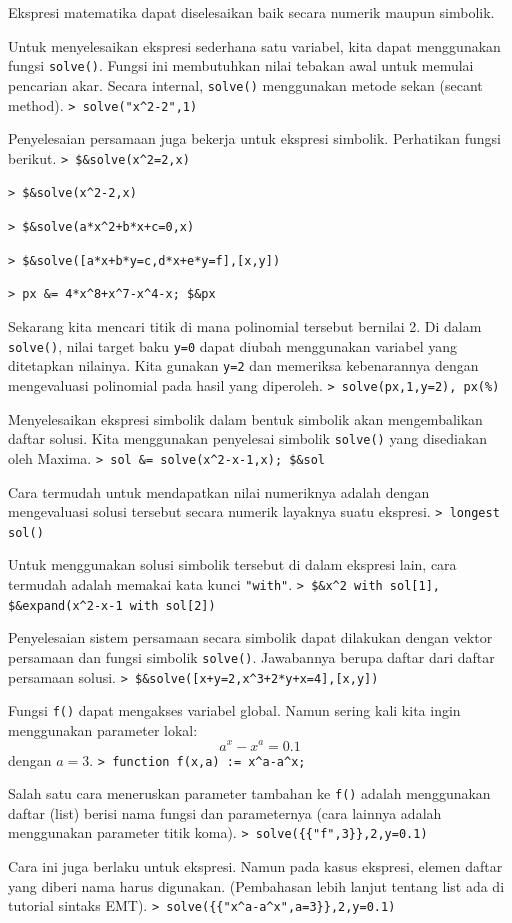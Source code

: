 \documentclass[11pt, a4paper]{article}
\newcommand{\emtcmd}[1]{\noindent\texttt{\textcolor{emtcommand}{>}\ #1}\par\smallskip}
\begin{document}
Ekspresi matematika dapat diselesaikan baik secara numerik maupun simbolik.

Untuk menyelesaikan ekspresi sederhana satu variabel, kita dapat menggunakan fungsi \texttt{solve()}. Fungsi ini membutuhkan nilai tebakan awal untuk memulai pencarian akar. Secara internal, \texttt{solve()} menggunakan metode sekan (secant method).
\emtcmd{solve("x\^{}2-2",1)}

Penyelesaian persamaan juga bekerja untuk ekspresi simbolik. Perhatikan fungsi berikut.
\emtcmd{\$\&solve(x\^{}2=2,x)}
\emtcmd{\$\&solve(x\^{}2-2,x)}
\emtcmd{\$\&solve(a*x\^{}2+b*x+c=0,x)}
\emtcmd{\$\&solve([a*x+b*y=c,d*x+e*y=f],[x,y])}
\emtcmd{px \&= 4*x\^{}8+x\^{}7-x\^{}4-x; \$\&px}

Sekarang kita mencari titik di mana polinomial tersebut bernilai 2. Di dalam \texttt{solve()}, nilai target baku \texttt{y=0} dapat diubah menggunakan variabel yang ditetapkan nilainya. Kita gunakan \texttt{y=2} dan memeriksa kebenarannya dengan mengevaluasi polinomial pada hasil yang diperoleh.
\emtcmd{solve(px,1,y=2), px(\%)}

Menyelesaikan ekspresi simbolik dalam bentuk simbolik akan mengembalikan daftar solusi. Kita menggunakan penyelesai simbolik \texttt{solve()} yang disediakan oleh Maxima.
\emtcmd{sol \&= solve(x\^{}2-x-1,x); \$\&sol}

Cara termudah untuk mendapatkan nilai numeriknya adalah dengan mengevaluasi solusi tersebut secara numerik layaknya suatu ekspresi.
\emtcmd{longest sol()}

Untuk menggunakan solusi simbolik tersebut di dalam ekspresi lain, cara termudah adalah memakai kata kunci \texttt{"with"}.
\emtcmd{\$\&x\^{}2 with sol[1], \$\&expand(x\^{}2-x-1 with sol[2])}

Penyelesaian sistem persamaan secara simbolik dapat dilakukan dengan vektor persamaan dan fungsi simbolik \texttt{solve()}. Jawabannya berupa daftar dari daftar persamaan solusi.
\emtcmd{\$\&solve([x+y=2,x\^{}3+2*y+x=4],[x,y])}

Fungsi \texttt{f()} dapat mengakses variabel global. Namun sering kali kita ingin menggunakan parameter lokal:
$$a^x-x^a = 0.1$$
dengan $a=3$.
\emtcmd{function f(x,a) := x\^{}a-a\^{}x;}

Salah satu cara meneruskan parameter tambahan ke \texttt{f()} adalah menggunakan daftar (list) berisi nama fungsi dan parameternya (cara lainnya adalah menggunakan parameter titik koma).
\emtcmd{solve(\{\{"f",3\}\},2,y=0.1)}

Cara ini juga berlaku untuk ekspresi. Namun pada kasus ekspresi, elemen daftar yang diberi nama harus digunakan. (Pembahasan lebih lanjut tentang list ada di tutorial sintaks EMT).
\emtcmd{solve(\{\{"x\^{}a-a\^{}x",a=3\}\},2,y=0.1)}
\end{document}
